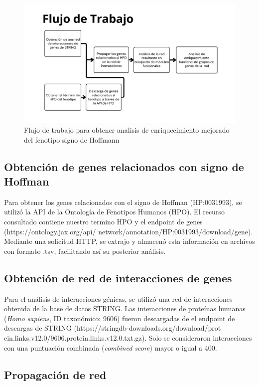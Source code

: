 \begin{figure}[h!]
	\includegraphics[width=.95\textwidth]{figures/workflow.png}
	\caption{Flujo de trabajo para obtener analisis de enriquecimiento mejorado del fenotipo signo de Hoffmann}
	\label{fig:workflow}
\end{figure}

\subsection{Obtención de genes relacionados con signo de Hoffman}

Para obtener los genes relacionados con el signo de Hoffman (HP:0031993), se utilizó la API de la Ontología de Fenotipos Humanos (HPO). El recurso consultado contiene nuestro termino HPO y el endpoint de genes (https://ontology.jax.org/api/
network/annotation/HP:0031993/download/gene). Mediante una solicitud HTTP, se extrajo y almacenó esta información en archivos con formato .tsv, facilitando así su posterior análisis. 


\subsection{Obtención de red de interacciones de genes}

Para el análisis de interacciones génicas, se utilizó una red de interacciones obtenida de la base de datos STRING. Las interacciones de proteínas humanas (\textit{Homo sapiens}, ID taxonómico: 9606) fueron descargadas de el endpoint de descargas de STRING (https://stringdb-downloads.org/download/prot ein.links.v12.0/9606.protein.links.v12.0.txt.gz). Solo se consideraron interacciones con una puntuación combinada (\textit{combined score}) mayor o igual a 400.

\newpage

\subsection{Propagación de red}


